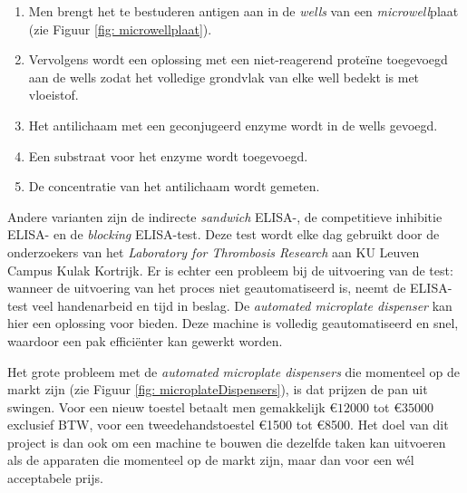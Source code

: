 \documentclass[a4paper,twoside,kulak]{kulakreport} %
\begin{document}
\begin{enumerate}
	\item Men brengt het te bestuderen antigen aan in de \textit{wells} van een \textit{microwell}plaat (zie Figuur \ref{fig: microwellplaat}).
	\item Vervolgens wordt een oplossing met een niet-reagerend proteïne toegevoegd aan de wells zodat het volledige grondvlak van elke well bedekt is met vloeistof.
	\item Het antilichaam met een geconjugeerd enzyme wordt in de wells gevoegd.
	\item Een substraat voor het enzyme wordt toegevoegd. 
	\item De concentratie van het antilichaam wordt gemeten.
\end{enumerate}
Andere varianten zijn de indirecte \textit{sandwich} ELISA-, de competitieve inhibitie ELISA- en de \textit{blocking} ELISA-test\cite{soortenELISA}.
Deze test wordt elke dag gebruikt door de onderzoekers van het \textit{Laboratory for Thrombosis Research} aan KU Leuven Campus Kulak Kortrijk. Er is echter een probleem bij de uitvoering van de test: wanneer de uitvoering van het proces niet geautomatiseerd is, neemt de ELISA-test veel handenarbeid en tijd in beslag. De \textit{automated microplate dispenser} kan hier een oplossing voor bieden. Deze machine is volledig geautomatiseerd en snel, waardoor een pak efficiënter kan gewerkt worden. 

Het grote probleem met de \textit{automated microplate dispensers} die momenteel op de markt zijn (zie Figuur \ref{fig: microplateDispensers}), is dat prijzen de pan uit swingen. Voor een nieuw toestel betaalt men gemakkelijk \euro $12000$ tot \euro $35000$\cite{BioSPX} exclusief BTW, voor een tweedehandstoestel \euro 1500 tot \euro 8500\cite{LabX}. Het doel van dit project is dan ook om een machine te bouwen die dezelfde taken kan uitvoeren als de apparaten die momenteel op de markt zijn, maar dan voor een wél acceptabele prijs.
\end{document}
